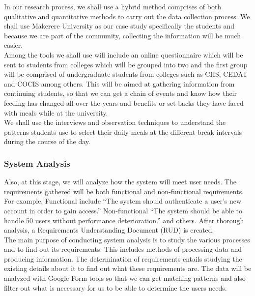 \documentclass {article}
\begin{document}
\noindent In our research process, we shall use a hybrid method comprises of both qualitative and quantitative methods to carry out the data collection process. We shall use Makerere University as our case study specifically the students and because we are part of the community, collecting the information will be much easier.\\

\noindent Among the tools we shall use will include an online questionnaire which will be sent to students from colleges which will be grouped into two and the first group will be comprised of undergraduate students from colleges such as CHS, CEDAT and COCIS among others. This will be aimed at gathering information from continuing students, so that we can get a chain of events and know how their feeding has changed all over the years and benefits or set backs they have faced with meals while at the university.\\

\noindent We shall use the interviews and observation techniques to understand the patterns students use to select their daily meals at the different break intervals during the course of the day.\\

\subsubsection{System Analysis}
\noindent Also, at this stage, we will analyze how the system will meet user needs. The requirements gathered will be both functional and non-functional requirements. For example, Functional include “The system should authenticate a user’s new account in order to gain access.” Non-functional “The system should be able to handle 50 users without performance deterioration.” and others. After thorough analysis, a Requirements Understanding Document (RUD) is created.\\

\noindent The main purpose of conducting system analysis is to study the various processes and to find out its requirements. This includes methods of processing data and producing information. The determination of requirements entails studying the existing details about it to find out what these requirements are. The data will be analyzed with Google Form tools so that we can get matching patterns and also filter out what is necessary for us to be able to determine the users needs.\\
\end{document}
